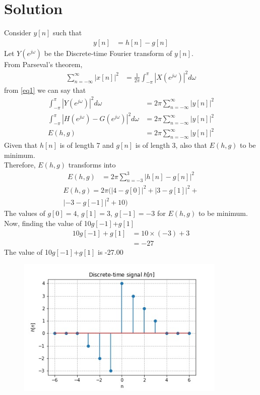 \documentclass[journal,12pt,twocolumn]{IEEEtran}
\begin{document}
\section*{Solution}
Consider $y[n]$ such that 
\begin{align}
    y[n]&=h[n]-g[n]
\end{align}
Let $Y(e^{j\omega})$ be the Discrete-time Fourier transform of $y[n]$.\\
From Parseval's theorem,
\begin{align}
    \sum_{n=-\infty}^{\infty}|x[n]|^2&=\frac{1}{2\pi}\int_{-\pi}^{\pi}\left|X(e^{j\omega})\right|^2d\omega \label{eq1}
\end{align}
from \eqref{eq1} we can say that
\begin{align}
    \int_{-\pi}^{\pi}\left|Y(e^{j\omega})\right|^2d\omega&=2\pi\sum_{n=-\infty}^{\infty}|y[n]|^2\\
    \int_{-\pi}^{\pi}\left|H(e^{j\omega})-G(e^{j\omega})\right|^2d\omega&=2\pi\sum_{n=-\infty}^{\infty}|y[n]|^2\\
    E(h,g)&=2\pi\sum_{n=-\infty}^{\infty}|y[n]|^2
\end{align}
Given that $h[n]$ is of length 7 and $g[n]$ is of length 3, also that $E(h,g)$ to be minimum.\\
Therefore, $E(h,g)$ transforms into
\begin{align}
    E(h,g)&=2\pi\sum_{n=-3}^{3}|h[n]-g[n]|^2
\end{align}
\begin{multline}
    E(h,g)=2\pi(|4-g[0]|^2+|3-g[1]|^2+\\|-3-g[-1]|^2+10)
\end{multline}
The values of $g[0]=4$, $g[1]=3$, $g[-1]=-3$ for $E(h,g)$ to be minimum.\\
Now, finding the value of 10$g[-1]$+$g[1]$
\begin{align}
    10g[-1]+g[1]&=10\times (-3)+3\\
    &=-27
\end{align}
The value of 10$g[-1]$+$g[1]$ is -27.00
\begin{figure}[h]
    \includegraphics[width=10cm]{h[n] signal.jpg}
\end{figure}
\end{document}
